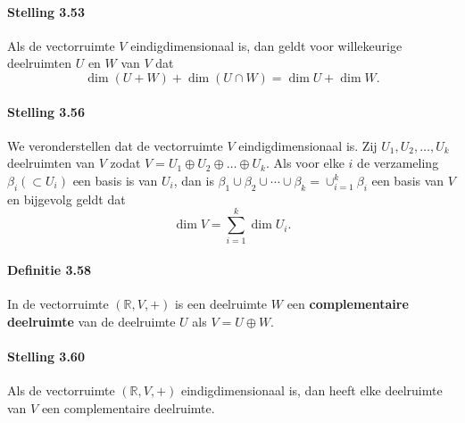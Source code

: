 \documentclass[11pt,oneside,a4paper]{article}
\begin{document}
	\paragraph{Stelling 3.53}	
		Als de vectorruimte $V$ eindigdimensionaal is, dan geldt voor willekeurige deelruimten $U$ en $W$ van $V$ dat
		$$\dim (U + W) + \dim(U \cap W) = \dim U + \dim W.$$
	\paragraph{Stelling 3.56}
		We veronderstellen dat de vectorruimte $V$ eindigdimensionaal is. Zij $U_1, U_2, \ldots , U_k$ deelruimten van $V$ zodat $V = U_1 \oplus U_2 \oplus \ldots \oplus U_k$. Als voor elke $i$ de verzameling $\beta_i (\subset U_i)$ een basis is van $U_i$, dan is $\beta_1 \cup \beta_2 \cup \cdots \cup \beta_k = \cup_{i=1}^k \beta_i$ een basis van $V$ en bijgevolg geldt dat $$\dim V = \sum\limits_{i=1}^k\dim U_i.$$ 
	\paragraph{Definitie 3.58}
		In de vectorruimte $(\mathbb{R}, V, +)$ is een deelruimte $W$ een \textbf{complementaire deelruimte} van de deelruimte $U$ als $V = U\oplus W$.
	\paragraph{Stelling 3.60}
		Als de vectorruimte $(\mathbb{R}, V, +)$ eindigdimensionaal is, dan heeft elke deelruimte van $V$ een complementaire deelruimte.
\end{document}

